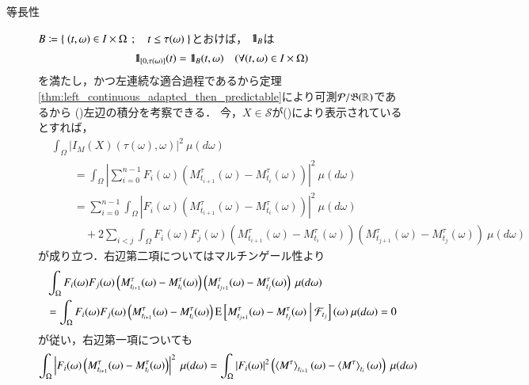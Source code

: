 \begin{prf}
\begin{description}
			\item[等長性]
				$B \coloneqq \left\{\ (t,\omega) \in I \times \Omega\ \, ; \quad t \leq \tau(\omega)\ \right\}$とおけば，
				$\mbox{1}\hspace{-0.25em}\mbox{l}_B$は
				\begin{align}
					\mbox{1}\hspace{-0.25em}\mbox{l}_{[0,\tau(\omega)]}(t) = \mbox{1}\hspace{-0.25em}\mbox{l}_B(t,\omega)
					\quad (\forall (t,\omega) \in I \times \Omega)
				\end{align}
				を満たし，かつ左連続な適合過程であるから定理\ref{thm:left_continuous_adapted_then_predictable}により可測$\mathcal{P}/\mathfrak{B}(\mathbb{R})$であるから
				()左辺の積分を考察できる．
				今，$X \in \mathcal{S}$が()により表示されているとすれば，
				\begin{align}
					&\int_\Omega \left| I_M(X)(\tau(\omega),\omega) \right|^2\ \mu(d\omega) \\
					&\qquad = \int_\Omega \left| \sum_{i=0}^{n-1} F_i(\omega) \left( M^\tau_{t_{i+1}}(\omega) - M^\tau_{t_i}(\omega) \right) \right|^2\ \mu(d\omega) \\
					&\qquad = \sum_{i=0}^{n-1} \int_\Omega \left| F_i(\omega) \left( M^\tau_{t_{i+1}}(\omega) - M^\tau_{t_i}(\omega) \right) \right|^2\ \mu(d\omega) \\
						&\quad\qquad + 2 \sum_{i<j} \int_\Omega F_i(\omega) F_j(\omega) \left( M^\tau_{t_{i+1}}(\omega) - M^\tau_{t_i}(\omega) \right) 
							\left( M^\tau_{t_{j+1}}(\omega) - M^\tau_{t_j}(\omega) \right)\ \mu(d\omega)
					\label{eq:thm_Ito_integral_linearity_isometric_2}
				\end{align}
				が成り立つ．右辺第二項についてはマルチンゲール性より
				\begin{align}
					&\int_\Omega F_i(\omega) F_j(\omega) \left( M^\tau_{t_{i+1}}(\omega) - M^\tau_{t_i}(\omega) \right) 
							\left( M^\tau_{t_{j+1}}(\omega) - M^\tau_{t_j}(\omega) \right)\ \mu(d\omega) \\
					&= \int_\Omega F_i(\omega) F_j(\omega) \left( M^\tau_{t_{i+1}}(\omega) - M^\tau_{t_i}(\omega) \right) 
							\operatorname{E} \left[ M^\tau_{t_{j+1}}(\omega) - M^\tau_{t_j}(\omega) \ \middle|\ \mathcal{F}_{t_j} \right](\omega)\ \mu(d\omega)
							= 0
				\end{align}
				が従い，右辺第一項についても
				\begin{align}
					\int_\Omega \left| F_i(\omega) \left( M^\tau_{t_{i+1}}(\omega) - M^\tau_{t_i}(\omega) \right) \right|^2\ \mu(d\omega)
					= \int_\Omega |F_i(\omega)|^2 \left( \inprod<M^\tau>_{t_{i+1}}(\omega) - \inprod<M^\tau>_{t_i}(\omega) \right)\ \mu(d\omega)
				\end{align}

\end{description}
\end{prf}
